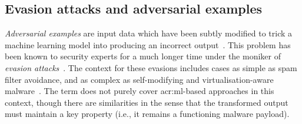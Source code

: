 
\subsection{Evasion attacks and adversarial examples}\label{sec:evasion-attacks}
\emph{Adversarial examples} are input data which have been subtly modified to trick a machine learning model into producing an incorrect output~\parencite{DBLP:conf/eurosp/PapernotMSW18,DBLP:conf/eurosp/PapernotMJFCS16}.
This problem has been known to security experts for a much longer time under the moniker of \emph{evasion attacks}~\parencite{DBLP:conf/ccs/BarrenoNSJT06}.
The context for these evasions includes cases as simple as spam filter avoidance, and as complex as self-modifying and virtualisation-aware malware~\parencite{DBLP:conf/acsac/CoptyDEEMZ18}.
The term does not purely cover \gls{acr:ml}-based approaches in this context, though there are similarities in the sense that the transformed output must maintain a key property (i.e., it remains a functioning malware payload).


